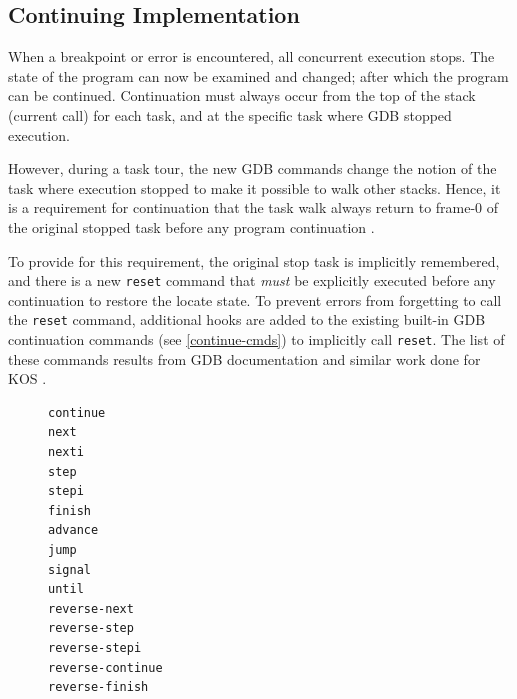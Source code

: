 \subsection{Continuing Implementation}
When a breakpoint or error is encountered, all concurrent execution stops.  The
state of the program can now be examined and changed; after which the program
can be continued. Continuation must always occur from the top of the stack
(current call) for each task, and at the specific task where GDB stopped
execution.

However, during a task tour, the new GDB commands change the notion of the task
where execution stopped to make it possible to walk other stacks.  Hence, it is
a requirement for continuation that the task walk always return to frame-0 of
the original stopped task before any program continuation \cite{Reference11}.


To provide for this requirement, the original stop task is implicitly
remembered, and there is a new \verb|reset| command that \emph{must} be
explicitly executed before any continuation to restore the locate state.  To
prevent errors from forgetting to call the \verb|reset| command, additional
hooks are added to the existing built-in GDB continuation commands (see
\ref{continue-cmds}) to implicitly call \verb|reset|. The list of these
commands results from GDB documentation \cite{Reference15} and similar work
done for KOS \cite{Reference14}.


\begin{figure}
\begin{lstlisting}[caption={Built-in GDB commands that allow continuation of a
program}, label={continue-cmds}, basicstyle=\small\tt]
continue
next
nexti
step
stepi
finish
advance
jump
signal
until
reverse-next
reverse-step
reverse-stepi
reverse-continue
reverse-finish
\end{lstlisting}
\end{figure}

